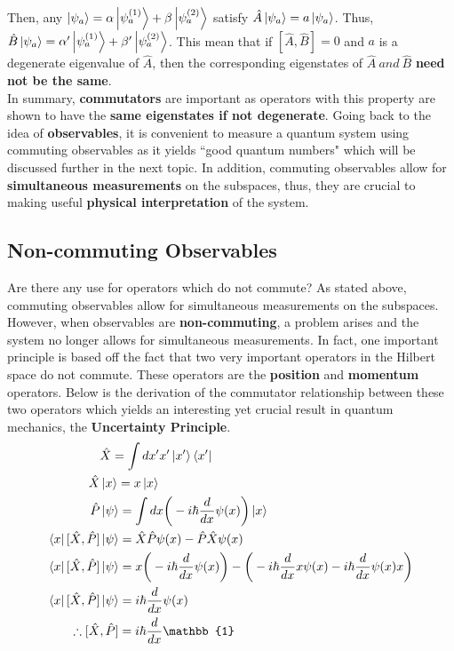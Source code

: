 \documentclass{article}
\begin{document}
\begin{flushleft}
Then, any $\ket{\psi_a}=\alpha\ket{\psi_a^{(1)}}+\beta\ket{\psi_a^{(2)}}$ satisfy $\hat{A}\ket{\psi_a}=a\ket{\psi_a}$. Thus, $\hat{B}\ket{\psi_a}=\alpha'\ket{\psi_a^{(1)}}+\beta'\ket{\psi_a^{(2)}}$. This mean that if $[\hat{A},\hat{B}]=0$ and $a$ is a degenerate eigenvalue of $\hat{A}$, then the corresponding eigenstates of $\hat{A}\ and\ \hat{B}$\textbf{ need not be the same}.\\[0.5cm]

In summary, \textbf{commutators} are important as operators with this property are shown to have the \textbf{same eigenstates if not degenerate}. Going back to the idea of \textbf{observables}, it is convenient to measure a quantum system using commuting observables as it yields ``good quantum numbers" which will be discussed further in the next topic. In addition, commuting observables allow for \textbf{simultaneous measurements} on the subspaces, thus, they are crucial to making useful \textbf{physical interpretation} of the system.

\subsection{Non-commuting Observables}

Are there any use for operators which do not commute? As stated above, commuting observables allow for simultaneous measurements on the subspaces. However, when observables are \textbf{non-commuting}, a problem arises and the system no longer allows for simultaneous measurements. In fact, one important principle is based off the fact that two very important operators in the Hilbert space do not commute.  These operators are the \textbf{position} and \textbf{momentum} operators. Below is the derivation of the commutator relationship between these two operators which yields an interesting yet crucial result in quantum mechanics, the \textbf{Uncertainty Principle}.\\

\begin{align*}
&\hat{X}=\int dx'x'\ket{x'}\bra{x'}\\
\hat{X}&\ket x=x\ket x\\
\hat{P}&\ket{\psi}=\int dx \bigg(-i\hbar \frac{d}{dx}\psi(x)\bigg)\ket x\\
\bra{x}[\hat{X},\hat{P}]&\ket\psi=\hat{X}\hat{P}\psi(x)-\hat{P}\hat{X}\psi(x)\\
\bra{x}[\hat{X},\hat{P}]&\ket\psi=x\bigg(-i\hbar\frac{d}{dx}\psi(x)\bigg)-\bigg(-i\hbar\frac{d}{dx}x\psi(x)-i\hbar\frac{d}{dx}\psi(x)x\bigg)\\
\bra{x}[\hat{X},\hat{P}]&\ket\psi=i\hbar\frac{d}{dx}\psi(x)\\
\therefore[\hat{X}&,\hat{P}]=i\hbar\frac{d}{dx}\mathbb{1}
\end{align*}


\end{flushleft}
\end{document}
